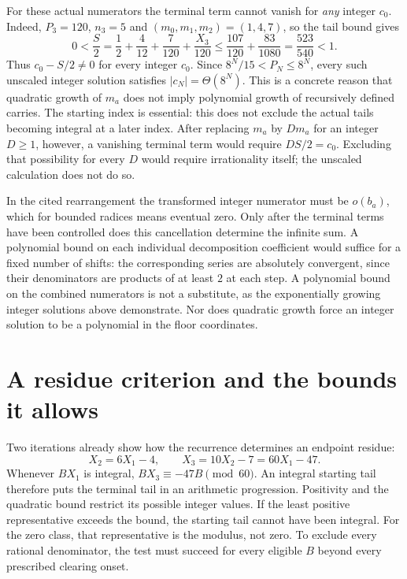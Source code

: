 \documentclass[11pt]{article}
\theoremstyle{remark}
\theoremstyle{plain}
\begin{document}
For these actual numerators the terminal term cannot vanish for
\emph{any} integer $c_0$.  Indeed, $P_3=120$, $n_3=5$ and
$(m_0,m_1,m_2)=(1,4,7)$, so the tail bound gives
\[
 0<\frac S2
 =\frac12+\frac4{12}+\frac7{120}+\frac{X_3}{120}
 \le\frac{107}{120}+\frac{83}{1080}
 =\frac{523}{540}<1.
\]
Thus $c_0-S/2\ne0$ for every integer $c_0$.  Since
$8^N/15<P_N\le8^N$, every such unscaled integer solution satisfies
$|c_N|=\Theta(8^N)$.  This is a concrete reason that quadratic growth of
$m_a$ does not imply polynomial growth of recursively defined carries.
The starting index is essential: this does not exclude the actual tails
becoming integral at a later index.  After replacing $m_a$ by $D m_a$ for an integer $D\ge1$, however, a
vanishing terminal term would require $DS/2=c_0$.  Excluding that
possibility for every $D$ would require irrationality itself; the
unscaled calculation does not do so.

In the cited rearrangement the transformed integer numerator must be
$o(b_a)$, which for bounded radices means eventual zero.  Only after the
terminal terms have been controlled does this cancellation determine the
infinite sum.  A polynomial bound on each individual decomposition
coefficient would suffice for a fixed number of shifts: the corresponding
series are absolutely convergent, since their denominators are products
of at least $2$ at each step.  A polynomial bound on the combined
numerators is not a substitute, as the exponentially growing integer solutions above demonstrate.  Nor does quadratic growth force an integer solution to be a polynomial in the floor coordinates.

\section{A residue criterion and the bounds it allows}\label{long269:sec:escape}

Two iterations already show how the recurrence determines an endpoint
residue:
\[
 X_2=6X_1-4,\qquad X_3=10X_2-7=60X_1-47.
\]
Whenever $BX_1$ is integral, $BX_3\equiv-47B\pmod{60}$.
An integral starting tail therefore puts the terminal tail in an
arithmetic progression. Positivity and the quadratic bound restrict its
possible integer values. If the least positive representative exceeds
the bound, the starting tail cannot have been integral. For the zero
class, that representative is the modulus, not zero. To exclude every
rational denominator, the test must succeed for every eligible $B$
beyond every prescribed clearing onset.
\end{document}
